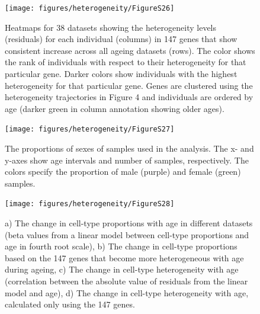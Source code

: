 \documentclass[12pt,twoside]{unicam}
\begin{document}
\begin{figure}

{\centering \texttt{[image: figures/heterogeneity/FigureS26]} 

}

\caption[Heatmaps for 38 datasets showing the heterogeneity levels for each individual in 147 genes that show consistent increase across all ageing datasets.]{Heatmaps for 38 datasets showing the heterogeneity levels (residuals) for each individual (columns) in 147 genes that show consistent increase across all ageing datasets (rows). The color shows the rank of individuals with respect to their heterogeneity for that particular gene. Darker colors show individuals with the highest heterogeneity for that particular gene. Genes are clustered using the heterogeneity trajectories in Figure 4 and individuals are ordered by age (darker green in column annotation showing older ages).  }\label{fig:hetFigS26}
\end{figure}

\begin{figure}

{\centering \texttt{[image: figures/heterogeneity/FigureS27]} 

}

\caption[The proportions of sexes of samples used in the analysis.]{The proportions of sexes of samples used in the analysis. The x- and y-axes show age intervals and number of samples, respectively. The colors specify the proportion of male (purple) and female (green) samples.}\label{fig:hetFigS27}
\end{figure}

\begin{figure}

{\centering \texttt{[image: figures/heterogeneity/FigureS28]} 

}

\caption[The change in cell-type proportions and heterogeneities with age in different datasets.]{a) The change in cell-type proportions with age in different datasets (beta values from a linear model between cell-type proportions and age in fourth root scale), b) The change in cell-type proportions based on the 147 genes that become more heterogeneous with age during ageing, c) The change in cell-type heterogeneity with age (correlation between the absolute value of residuals from the linear model and age), d) The change in cell-type heterogeneity with age, calculated only using the 147 genes.}\label{fig:hetFigS28}
\end{figure}
\end{document}
